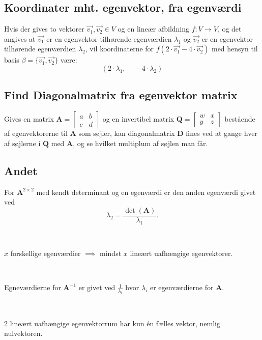 \subsection{Koordinater mht. egenvektor, fra egenværdi}
Hvis der gives to vektorer $\vec{v_1}, \vec{v_2} \in V$ og en lineær afbildning $f: V \to V$, og det angives at $\vec{v_1}$ er en egenvektor tilhørende egenværdien $\lambda_1$ og $\vec{v_2}$ er en egenvektor tilhørende egenværdien $\lambda_2$, vil koordinaterne for \(f(2 \cdot \vec{v_1} - 4 \cdot \vec{v_2})\) med hensyn til basis \(\beta = \{\vec{v_1}, \vec{v_2}\}\) være:
\[
    (2 \cdot \lambda_1, \quad -4 \cdot \lambda_2)
\]

\subsection{Find Diagonalmatrix fra egenvektor matrix}

Gives en matrix \( \mathbf{A} = \begin{bmatrix}
    a & b \\
    c & d
\end{bmatrix}
\) og en invertibel matrix \( \mathbf{Q} = \begin{bmatrix}
    w & x \\
    y & z
\end{bmatrix}
\) bestående af egenvektorerne til $\mathbf{A}$ som søjler, kan diagonalmatrix $\mathbf{D}$ fines ved at gange hver af søjlerne i $\mathbf{Q}$ med $\mathbf{A}$, og se hvilket multiplum af søjlen man får.


\subsection{Andet}

For $\mathbf{A}^{2 \times 2}$ med kendt determinant og en egenværdi er den anden egenværdi givet ved
\[\lambda_2 = \frac{\det(\mathbf{A})}{\lambda_1}.\]

\

$x$ forskellige egenværdier $\implies$ mindst $x$ lineært uafhængige egenvektorer.

\

Egneværdierne for $\mathbf{A}^{-1}$ er givet ved $\frac{1}{\lambda_i}$ hvor $\lambda_i$ er egenværdierne for $\mathbf{A}$.

\

2 lineært uafhængige egenvektorrum har kun én fælles vektor, nemlig nulvektoren.